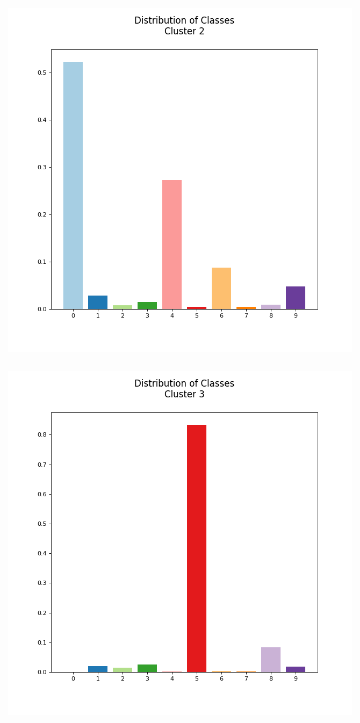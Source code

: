 \documentclass[12pt, a4paper]{article}
\begin{document}
\begin{figure}[h]
\begin{subfigure}{0.3\linewidth}
    \end{subfigure}
    \hfill
    \begin{subfigure}{0.3\linewidth}
        \centering
        \includegraphics[scale=0.15]{images/q4/g/cluster2.png}
    \end{subfigure}
    \newline
    \begin{subfigure}{0.3\linewidth}
        \centering
        \includegraphics[scale=0.15]{images/q4/g/cluster3.png}

\end{subfigure}
\end{figure}
\end{document}
